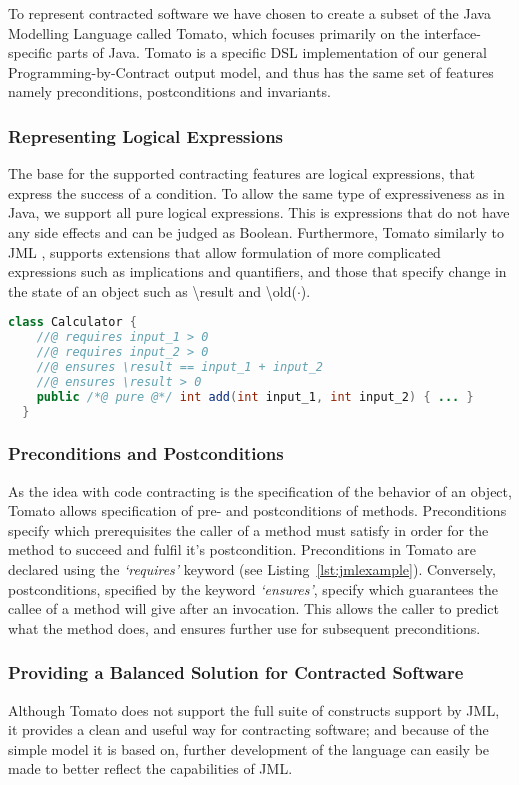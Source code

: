To represent contracted software we have chosen to create a subset of the
Java Modelling Language called Tomato,
which focuses primarily on the interface-specific parts of Java.
Tomato is a specific DSL implementation of our general Programming-by-Contract output model, and thus has the same set of features
namely preconditions, postconditions and invariants.

\subsubsection{Representing Logical Expressions}
\label{sub:Representing Logical Expressions}
The base for the supported contracting features are logical expressions, that express
the success of a condition.
To allow the same type of expressiveness as in Java, we support all pure
logical expressions. This is expressions that do not have any side effects and can be judged as Boolean.
Furthermore, Tomato similarly to JML \cite{leavens2006design},
supports extensions that allow formulation of more complicated
expressions such as implications and quantifiers,
and those that specify change in the state of an object such as \textbackslash result
and \textbackslash old($\cdot$).

\begin{lstlisting}[language=Java,caption={Contracted Method for Adding Natural Numbers},label={lst:jmlexample}]
  class Calculator {
    //@ requires input_1 > 0
    //@ requires input_2 > 0
    //@ ensures \result == input_1 + input_2
    //@ ensures \result > 0
    public /*@ pure @*/ int add(int input_1, int input_2) { ... }
  }
\end{lstlisting}

\subsubsection{Preconditions and Postconditions}
\label{sub:Preconditions and Postconditions}

As the idea with code contracting is the specification of the behavior of
an object, Tomato allows specification of pre- and postconditions of methods.
Preconditions specify which prerequisites the caller of a method must
satisfy in order for the method to succeed and fulfil it's postcondition.
Preconditions in Tomato are declared using the \emph{`requires'}
keyword (see Listing~\ref{lst:jmlexample}).
Conversely, postconditions, specified by the keyword \emph{`ensures'},
specify which guarantees the callee of a method will give after an invocation.
This allows the caller to predict what the method does,
and ensures further use for subsequent preconditions.

\subsubsection{Providing a Balanced Solution for Contracted Software}
\label{ssub:ProvidingaBalancedSolutionforContractedSoftware}
Although Tomato does not support the full suite of constructs support by JML, it provides a clean and useful way for contracting software; and because of 
the simple model it is based on, further development of the language can easily be made to better reflect the capabilities of JML.

